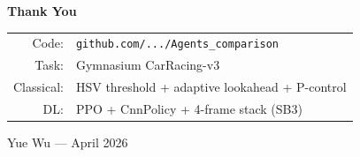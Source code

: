 \documentclass[aspectratio=169, 12pt]{beamer}
\begin{document}
\begin{frame}{}
\centering
\vspace{2em}
{\Huge\bfseries Thank You}

\vspace{1.5em}
{\large
\begin{tabular}{rl}
Code: & \texttt{github.com/.../Agents\_comparison} \\
Task: & Gymnasium CarRacing-v3 \\
Classical: & HSV threshold + adaptive lookahead + P-control \\
DL: & PPO + CnnPolicy + 4-frame stack (SB3) \\
\end{tabular}
}

\vspace{1.5em}
{\color{gray}\small Yue Wu --- April 2026}
\end{frame}
\end{document}
